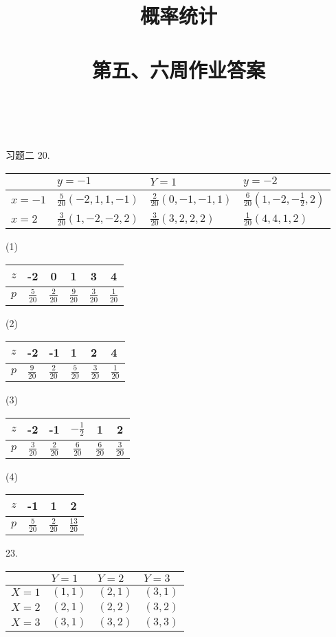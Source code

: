 \documentclass[14pt]{scrartcl} %
\title{	
	\normalfont \huge
	\textsc{概率统计} \\ [25pt] %
	\horrule{0.5pt} \\[0.4cm] %
	\huge 第五、六周作业答案 \\ %
	\horrule{0.5pt} \\[0.4cm] %
	\date{}
}
\numberwithin{equation}{section} %
\numberwithin{figure}{section} %
\numberwithin{table}{section} %
\begin{document}
	\maketitle %
	习题二
	20. 
	\begin{center}
		\begin{tabular}{l|l|l|l}
			& $y=-1$ & $Y=1$ & $y=-2$ \\
			\hline
			$x=-1$ & $\frac{5}{20}(-2,1,1,-1)$ & $\frac{2}{20}(0,-1,-1,1)$ & $\frac{6}{20}\left(1,-2,-\frac{1}{2}, 2\right)$ \\
			\hline
			$x=2$ & $\frac{3}{20}(1,-2,-2,2)$ & $\frac{3}{20}(3,2,2,2)$ & $\frac{1}{20}(4,4,1,2)$ \\
			\hline
		\end{tabular}
	\end{center}
	
	(1)
	
	\begin{tabular}{c|c|c|c|c|c}
		$z$ & -2 & 0 & 1 & 3 & 4 \\
		\hline
		$p$ & $\frac{5}{20}$ & $\frac{2}{20}$ & $\frac{9}{20}$ & $\frac{3}{20}$ & $\frac{1}{20}$ \\
		\hline
	\end{tabular}
	
	(2) \begin{tabular}{l|l|l|l|l|l}
		$z$ & -2 & -1 & 1 & 2 & 4 \\
		\hline
		$p$ & $\frac{9}{20}$ & $\frac{2}{20}$ & $\frac{5}{20}$ & $\frac{3}{20}$ & $\frac{1}{20}$ \\
		\hline
	\end{tabular}
	
	(3) \begin{tabular}{c|c|c|c|c|c}
		$z$ & -2 & -1 & $-\frac{1}{2}$ & 1 & 2 \\
		\hline
		$p$ & $\frac{3}{20}$ & $\frac{2}{20}$ & $\frac{6}{20}$ & $\frac{6}{20}$ & $\frac{3}{20}$ \\
		\hline
	\end{tabular}
	
	(4) \begin{tabular}{c|c|c|c}
		$z$ & -1 & 1 & 2 \\
		\hline
		$p$ & $\frac{5}{20}$ & $\frac{2}{20}$ & $\frac{13}{20}$ \\
		\hline
	\end{tabular}
	
	
	23.
	
	\begin{center}
		\begin{tabular}{l|l|l|l}
			& $Y=1$ & $Y=2$ & $Y=3$ \\
			\hline
			$X=1$ & $(1,1)$ & $(2,1)$ & $(3,1)$ \\
			\hline
			$X=2$ & $(2,1)$ & $(2,2)$ & $(3,2)$ \\
			\hline
			$X=3$ & $(3,1)$ & $(3,2)$ & $(3,3)$ \\
			\hline
		\end{tabular}
	\end{center}
	
\end{document}
